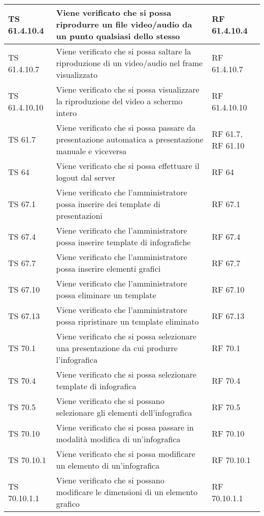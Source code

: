{{\begin{longtable} [c]{| p{3cm} | p{6cm} |p{3cm}|}
			\hline
			TS 61.4.10.4 & Viene verificato che si possa riprodurre un file video/audio da un punto qualsiasi dello stesso & RF 61.4.10.4\\
			\hline
			TS 61.4.10.7 & Viene verificato che si possa saltare la riproduzione di un video/audio nel frame\ped{g} visualizzato & RF 61.4.10.7\\
			\hline
			TS 61.4.10.10 & Viene verificato che si possa visualizzare la riproduzione del video a schermo intero & RF 61.4.10.10\\
			\hline
			TS 61.7 & Viene verificato che si possa passare da presentazione automatica a presentazione manuale e viceversa & RF 61.7, RF 61.10\\
			\hline
			TS 64 & Viene verificato che si possa effettuare il logout\ped{g} dal server\ped{g} & RF 64\\
			\hline
			TS 67.1 & Viene verificato che l'amministratore possa inserire dei template\ped{g} di presentazioni & RF 67.1\\
			\hline
			TS 67.4 & Viene verificato che l'amministratore possa inserire template\ped{g} di infografiche\ped{g} & RF 67.4\\
			\hline
			TS 67.7 & Viene verificato che l'amministratore possa inserire elementi grafici & RF 67.7\\
			\hline
			TS 67.10 & Viene verificato che l'amministratore possa eliminare un template\ped{g} & RF 67.10\\
			\hline
			TS 67.13 & Viene verificato che l'amministratore possa ripristinare un template eliminato & RF 67.13\\
			\hline
			TS 70.1 & Viene verificato che si possa selezionare una presentazione da cui produrre l'infografica\ped{g}  & RF 70.1\\
			\hline
			TS 70.4 & Viene verificato che si possa selezionare template\ped{g} di infografica\ped{g} & RF 70.4\\
			\hline
			TS 70.5 & Viene verificato che si possano selezionare gli elementi dell'infografica  & RF 70.5\\
			\hline
			TS 70.10 & Viene verificato che si possa passare in modalità modifica di un'infografica\ped{g} & RF 70.10\\
			\hline
			TS 70.10.1 & Viene verificato che si possa modificare un elemento di un'infografica\ped{g} & RF 70.10.1\\
			\hline
			TS 70.10.1.1 & Viene verificato che si possano modificare le dimensioni di un elemento grafico & RF 70.10.1.1\\

\end{longtable}}}
